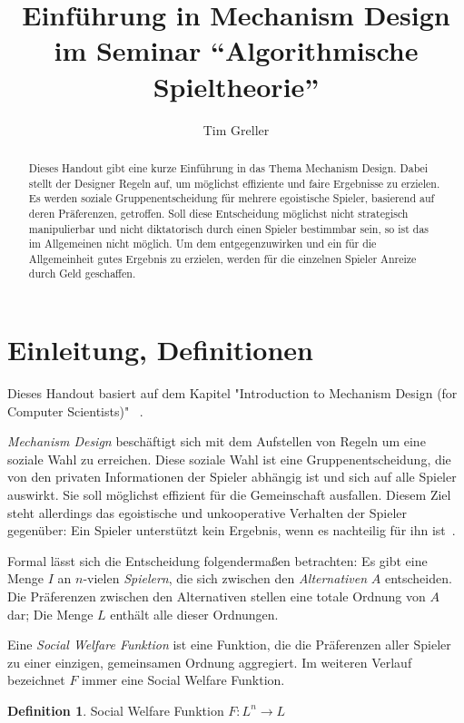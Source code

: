 \documentclass[a4paper,11pt]{article}
\title{Einführung in Mechanism Design \\ \Large im Seminar ``Algorithmische Spieltheorie''}
\author{Tim Greller}
\theoremstyle{definition}
\newtheorem{definition}{Definition}
\theoremstyle{plain}
\theoremstyle{definition}
\begin{document}
\maketitle

\begin{abstract}
	Dieses Handout gibt eine kurze Einführung in das Thema Mechanism Design. Dabei stellt der Designer Regeln auf, um möglichst effiziente und faire Ergebnisse zu erzielen. Es werden soziale Gruppenentscheidung für mehrere egoistische Spieler, basierend auf deren Präferenzen, getroffen. Soll diese Entscheidung möglichst nicht strategisch manipulierbar und nicht diktatorisch durch einen Spieler bestimmbar sein, so ist das im Allgemeinen nicht möglich. Um dem entgegenzuwirken und ein für die Allgemeinheit gutes Ergebnis zu erzielen, werden für die einzelnen Spieler Anreize durch Geld geschaffen.
\end{abstract}

\setcounter{page}{0}
\fancyhead{}
\fancyhead[ER]{\leftmark}
\fancyhead[OL]{\rightmark}
\fancyhead[EL,OR]{\thepage}
\pagestyle{fancy}

\section{Einleitung, Definitionen}
Dieses Handout basiert auf dem Kapitel "Introduction to Mechanism Design (for Computer Scientists)" ~\cite{nis07}.

\emph{Mechanism Design} beschäftigt sich mit dem Aufstellen von Regeln um eine soziale Wahl zu erreichen. Diese soziale Wahl ist eine Gruppenentscheidung, die von den privaten Informationen der Spieler abhängig ist und sich auf alle Spieler auswirkt. Sie soll möglichst effizient für die Gemeinschaft ausfallen. Diesem Ziel steht allerdings das egoistische und unkooperative Verhalten der Spieler gegenüber: Ein Spieler unterstützt kein Ergebnis, wenn es nachteilig für ihn ist~\cite{ste08}.

Formal lässt sich die Entscheidung folgendermaßen betrachten:
Es gibt eine Menge $I$ an $n$-vielen \emph{Spielern}, die sich zwischen den \emph{Alternativen} $A$ entscheiden. Die Präferenzen zwischen den Alternativen stellen eine totale Ordnung von $A$ dar; Die Menge $L$ enthält alle dieser Ordnungen.

Eine \emph{Social Welfare Funktion} ist eine Funktion, die die Präferenzen aller Spieler zu einer einzigen, gemeinsamen Ordnung aggregiert. Im weiteren Verlauf bezeichnet $F$ immer eine Social Welfare Funktion.
\begin{definition}
	\label{def:socialwelfarefunc}
	Social Welfare Funktion $F : L^n \rightarrow L$
\end{definition}
\end{document}
